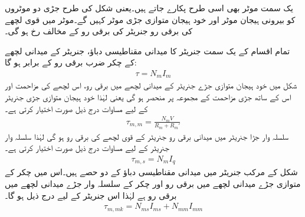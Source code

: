 یک سمت  موٹر بھی اسی طرح پکارے جاتے ہیں۔یعنی شکل   کی طرح جڑی دو موٹروں کو بیرونی ہیجان موٹر اور خود ہیجان متوازی جڑی موٹر کہیں گے۔موٹر میں قوی لچھے کی  برقی رو جنریٹر کی برقی رو کے  مخالف رخ ہو گی۔

تمام اقسام کے یک سمت  جنریٹر کا میدانی مقناطیسی دباؤ، جنریٹر کے میدانی لچھے کے چکر ضرب برقی رو کے برابر ہو گا:
\begin{align}\label{مساوات_یک_سمت_میدانی_دباو}
\tau=N_m I_m
\end{align}
شکل   میں خود ہیجان متوازی جڑے جنریٹر کے میدانی لچھے میں برقی رو، اس لچھے کی مزاحمت  اور اس کے ساتھ جڑی مزاحمت کے مجموعہ   پر منحصر ہو گی  یعنی  لہٰذا خود ہیجان متوازی جڑی جنریٹر کے لیے  مساوات   درج ذیل  صورت اختیار کرتی ہے۔
\begin{align}
\tau_{m,m}=\frac{N_m V}{R_m+R_m'}
\end{align}
سلسلہ وار جڑا جنریٹر میں میدانی برقی رو جنریٹر کے قوی لچھے کی  برقی رو ہو گی  لہٰذا سلسلہ وار جنریٹر کے لیے مساوات  درج ذیل صورت اختیار کرتی ہے۔
\begin{align}
\tau_{m,s}=N_m I_q
\end{align}
شکل   کے مرکب جنریٹر میں میدانی مقناطیسی دباؤ کے دو حصے ہیں۔اس میں  چکر کے متوازی جڑے میدانی لچھے میں برقی رو   اور   چکر کے سلسلہ وار جڑے میدانی لچھے میں  برقی رو  ہے لہٰذا اس جنریٹر کے لیے درج ذیل ہو گا۔
\begin{align}
\tau_{m,mk}=N_{ms} I_{ms}+N_{mm} I_{mm}
\end{align}

